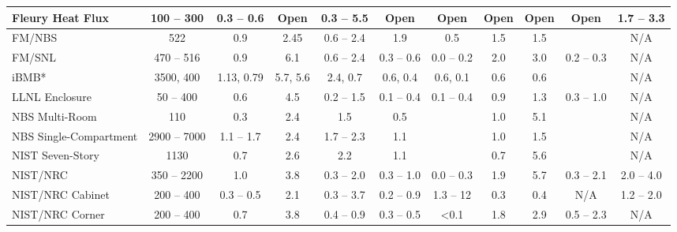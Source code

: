 \begin{landscape}
\begin{longtable}{|l|c|c|c|c|c|c|c|c|c|c|}
Fleury Heat Flux    & 100 -- 300    & 0.3 -- 0.6    & Open  & 0.3 -- 5.5        & Open                & Open          & Open        & Open        & Open                  & 1.7 -- 3.3            \\ \hline
FM/NBS              & 522           & 0.9           & 2.45  & 0.6 -- 2.4        & 1.9                 & 0.5           & 1.5         & 1.5         &                        & N/A                      \\ \hline
FM/SNL              & 470 -- 516    & 0.9           & 6.1   & 0.6 -- 2.4        & 0.3 -- 0.6          & 0.0 -- 0.2    & 2.0         & 3.0         & 0.2 -- 0.3             & N/A                      \\ \hline
iBMB*               & 3500, 400     & 1.13, 0.79    & 5.7, 5.6 & 2.4, 0.7       & 0.6, 0.4            & 0.6, 0.1      & 0.6         & 0.6         &                        &  N/A                     \\ \hline
LLNL Enclosure      & 50 -- 400     & 0.6           & 4.5   & 0.2 -- 1.5        & 0.1 -- 0.4          & 0.1 -- 0.4    & 0.9         & 1.3         & 0.3 -- 1.0             & N/A                      \\ \hline
NBS Multi-Room      & 110           & 0.3           & 2.4   & 1.5               & 0.5                 &               & 1.0         & 5.1         &                        &  N/A                     \\ \hline
NBS Single-Compartment & 2900 -- 7000 & 1.1 -- 1.7  & 2.4   & 1.7 -- 2.3        &1.1                  &               & 1.0         & 1.5         &                        & N/A                      \\ \hline
NIST Seven-Story    & 1130          &  0.7          & 2.6   & 2.2               & 1.1                 &               & 0.7         & 5.6         &                        & N/A                      \\ \hline
NIST/NRC            & 350 -- 2200   & 1.0           & 3.8   & 0.3 -- 2.0        & 0.3 -- 1.0          & 0.0 -- 0.3    & 1.9         & 5.7         & 0.3 -- 2.1             & 2.0 -- 4.0            \\ \hline
NIST/NRC Cabinet    & 200 -- 400    & 0.3 -- 0.5    & 2.1   & 0.3 -- 3.7        & 0.2 -- 0.9          & 1.3 -- 12     & 0.3         & 0.4         & N/A                   & 1.2 -- 2.0            \\ \hline
NIST/NRC Corner     & 200 -- 400    & 0.7           & 3.8   & 0.4 -- 0.9        & 0.3 -- 0.5          & <0.1          & 1.8         & 2.9         & 0.5 -- 2.3            & N/A                   \\ \hline

\end{longtable}
\end{landscape}
